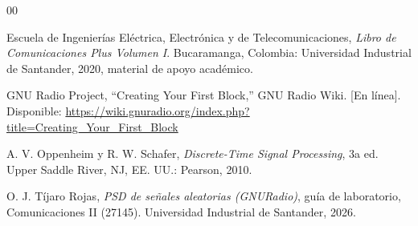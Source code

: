\documentclass[twocolumn]{IEEEtran}
\begin{document}


\begin{thebibliography}{00}

Escuela de Ingenierías Eléctrica, Electrónica y de Telecomunicaciones, 
\textit{Libro de Comunicaciones Plus Volumen I}. 
Bucaramanga, Colombia: Universidad Industrial de Santander, 2020, material de apoyo académico.

GNU Radio Project, ``Creating Your First Block,'' GNU Radio Wiki. [En línea]. Disponible: \url{https://wiki.gnuradio.org/index.php?title=Creating_Your_First_Block}

A. V. Oppenheim y R. W. Schafer, \textit{Discrete-Time Signal Processing}, 3a ed. Upper Saddle River, NJ, EE. UU.: Pearson, 2010.

O. J. Tíjaro Rojas, \textit{PSD de señales aleatorias (GNURadio)}, guía de laboratorio, Comunicaciones II (27145). Universidad Industrial de Santander, 2026.

\end{thebibliography}
\end{document}
